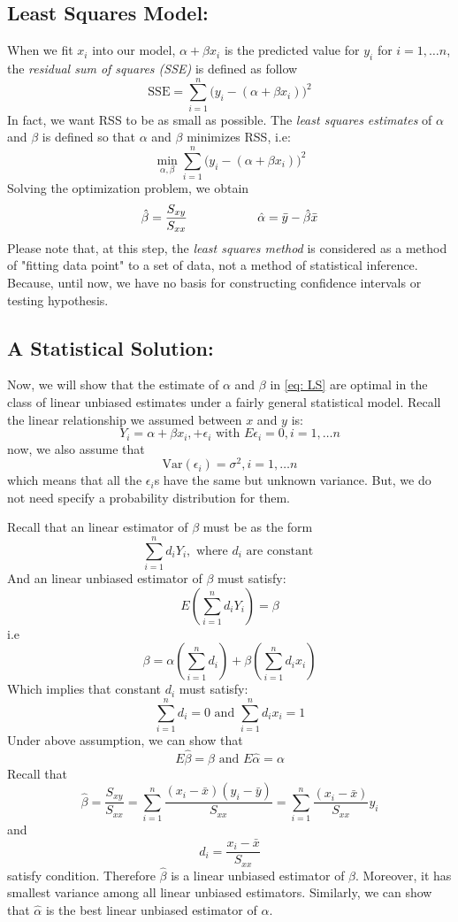 \documentclass[11pt]{article}
\begin{document}
\subsection{Least Squares Model: }
When we fit $x_i$ into our model, $\alpha + \beta x_i$ is the predicted value for $y_i$ for $i = 1,\dots n$, the \textit{residual sum of squares (SSE)} is defined as follow 
\begin{equation}\label{eq: RSS}
	\text{SSE} = \sum_{i = 1}^n \big(y_i - (\alpha + \beta x_i )\big)^2
\end{equation}
In fact, we want RSS to be as small as possible. The \textit{least squares estimates } of $\alpha$ and $\beta$ is defined so that $\alpha$ and $\beta$ minimizes RSS, i.e:
$$\min_{\alpha, \beta}   \sum_{i = 1}^n \big(y_i - (\alpha + \beta x_i )\big)^2$$
Solving the optimization problem, we obtain 
\begin{equation} \label{eq: LS}
	\hat{\beta} = \dfrac{S_{xy}}{S_{xx}}  \hspace*{2.0cm} \hat{\alpha}= \bar{y} - \hat{\beta}\bar{x}
\end{equation}
Please note that, at this step, the \textit{least squares method} is considered as a method of "fitting data point" to a set of data, not a method of statistical inference. Because, until now, we have no basis for constructing confidence intervals or testing hypothesis. 

\subsection{A Statistical Solution: }
Now, we will show that the estimate of $\alpha$ and $\beta$ in \ref{eq: LS} are optimal in the class of linear unbiased estimates under a fairly general statistical model. Recall the linear relationship we assumed between $x$ and $y$  is:
$$ Y_i = \alpha + \beta x_i, + \epsilon_i  \text{ with } E\epsilon_i = 0, i = 1, \dots n $$ 
now, we also assume that 
$$\text{Var}(\epsilon_i) = \sigma^2, i = 1, \dots n  $$
which means that all the $\epsilon_i$s have the same but unknown variance. But, we do not need specify a probability distribution for them.

Recall that an linear  estimator of $\beta$ must be as the form 
$$\sum_{i = 1}^n d_i Y_i, \text{ where } d_i \text{ are constant } $$
And an linear unbiased estimator of $\beta$ must satisfy:
 $$E(\sum_{i = 1}^n d_i Y_i) = \beta $$
 i.e 
 $$ \beta = \alpha \left(\sum_{i = 1}^n d_i\right) +\beta \left( \sum_{ i = 1}^n d_i x_i\right) $$
 Which implies that constant $d_i$ must satisfy:
 $$ \sum_{i = 1}^n d_i = 0 \text{ and } \sum_{i = 1}^n d_i x_i = 1$$
Under above assumption, we can show that 
$$E\hat{\beta} = \beta \text{ and } E\hat{\alpha} = \alpha $$
Recall that 
$$\hat{\beta } = \dfrac{S_{xy}}{S_{xx}} = \sum_{i = 1}^n \dfrac{(x_i - \bar{x})(y_i -\bar{y})}{S_{xx}} = \sum_{i = 1}^n \dfrac{(x_i -\bar{x})}{S_{xx}} y_i  $$ 
and $$d_i = \dfrac{x_i - \bar{x}}{S_{xx}} $$ satisfy condition. Therefore $\hat{\beta}$ is a linear unbiased estimator of $\beta$. 
Moreover, it has smallest variance among all linear unbiased estimators. Similarly, we can show that $\hat{\alpha}$ is the best linear unbiased estimator of $\alpha$.
\end{document}
